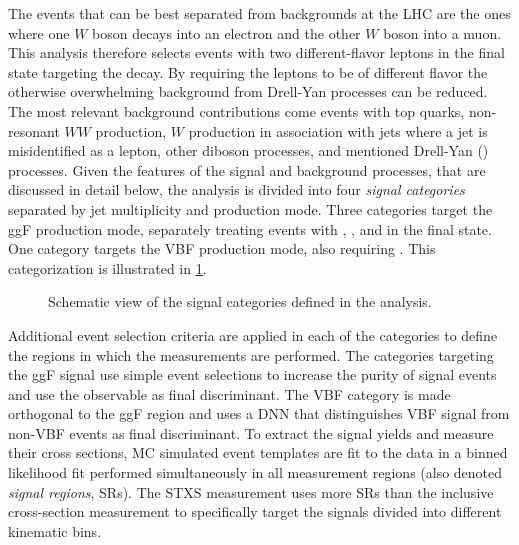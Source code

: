 The \HWW events that can be best separated from backgrounds at the LHC are the ones where one $W$ boson decays into an electron and the other $W$ boson into a muon.
This analysis therefore selects events with two different-flavor leptons in the final state targeting the \HWWdet decay.
By requiring the leptons to be of different flavor the otherwise overwhelming background from Drell-Yan processes can be reduced. 
The most relevant background contributions come events with top quarks, non-resonant $WW$ production, $W$ production in association with jets where a jet is misidentified as a lepton, other diboson processes, and mentioned Drell-Yan (\Zgamma) processes.
Given the features of the signal and background processes, that are discussed in detail below, the analysis is divided into four \emph{signal categories} separated by jet multiplicity and production mode.
Three categories target the ggF production mode, separately treating events with \ZeroJet, \OneJet, and \TwoJet in the final state. One category targets the VBF production mode, also requiring \TwoJet. 
This categorization is illustrated in \cref{fig:signal-categorization}. 
\begin{figure}
    \caption{Schematic view of the signal categories defined in the \HWW analysis.}
    \label{fig:signal-categorization}
\end{figure}
Additional event selection criteria are applied in each of the categories to define the regions in which the measurements are performed.
The categories targeting the ggF signal use simple event selections to increase the purity of signal events and use the \mT observable as final discriminant. 
The VBF \TwoJet category is made orthogonal to the ggF \TwoJet region and uses a DNN that distinguishes VBF signal from non-VBF events as final discriminant.
To extract the signal yields and measure their cross sections, MC simulated event templates are fit to the data in a binned likelihood fit performed simultaneously in all measurement regions (also denoted \emph{signal regions}, SRs).
The STXS measurement uses more SRs than the inclusive cross-section measurement to specifically target the signals divided into different kinematic bins. 


